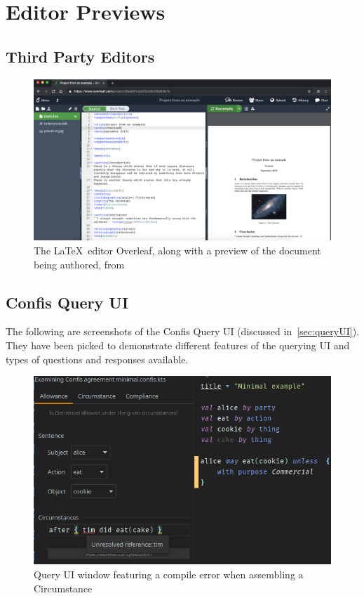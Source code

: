 \chapter{Editor Previews}\label{ch:editor-previews}

\section{Third Party Editors}\label{sec:third-partty-editors}

\begin{figure}[h]
    \centering
    \includegraphics[width=\textwidth]{figures/overleafEditor}
    \caption{The \LaTeX \ editor Overleaf, along with a preview of the document being authored, from~\cite{overleafDocs}}
    \label{fig:overleafPreview}
\end{figure}

\section{Confis Query UI}\label{sec:app:confis-query-ui}

The following are screenshots of the Confis Query UI (discussed in~\autoref{sec:queryUI}).
They have been picked to demonstrate different features of the querying UI and types of questions and responses available.

\begin{figure}[h]
    \centering
    \includegraphics[width=\textwidth]{figures/queryUi-compileError}
    \caption{Query UI window featuring a compile error when assembling a Circumstance}
    \label{fig:queryUI:circumstanceError}
\end{figure}

